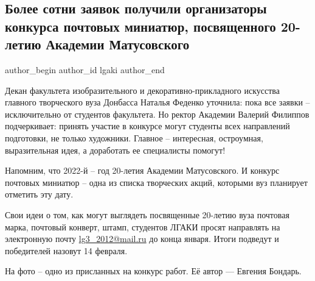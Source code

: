  
 
 
 
 
\subsection{Более сотни заявок получили организаторы конкурса почтовых миниатюр, посвященного 20-летию Академии Матусовского}
\label{sec:13_01_2022.stz.edu.lnr.lgaki.1.konkurs_pochta_miniatjura}

\ifcmt
 author_begin
   author_id lgaki
 author_end
\fi

Декан факультета изобразительного и декоративно-прикладного искусства главного
творческого вуза Донбасса Наталья Феденко уточнила: пока все заявки –
исключительно от студентов факультета. Но ректор Академии Валерий Филиппов
подчеркивает: принять участие в конкурсе могут студенты всех направлений
подготовки, не только художники. Главное – интересная, остроумная,
выразительная идея, а доработать ее специалисты помогут!


Напомним, что 2022-й – год 20-летия Академии Матусовского. И конкурс почтовых
миниатюр – одна из списка творческих акций, которыми вуз планирует отметить эту
дату.

Свои идеи о том, как могут выглядеть посвященные 20-летию вуза почтовая марка,
почтовый конверт, штамп, студентов ЛГАКИ просят направлять на электронную почту
\url{lg3_2012@mail.ru} до конца января. Итоги подведут и победителей назовут 14
февраля.

На фото – одно из присланных на конкурс работ. Её автор — Евгения Бондарь.

